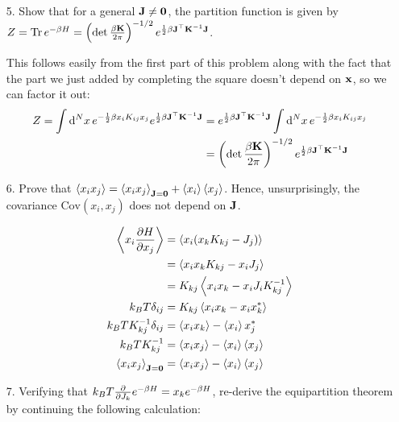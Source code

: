 \documentclass[a4paper,twoside]{article}
\begin{document}
\begin{itemize}
\begin{problem}
\begin{equation}
            \end{equation}
        \end{problem}
    \item[5.] Show that for a general $ \vb{J} \neq \vb{0} $, the partition function is given by $ Z = \Tr e^{- \beta H} = \left( \det \frac{\beta \vb{K}}{2 \pi} \right)^{- 1/2}e^{\frac{1}{2} \beta \vb{J}^\top \vb{K}^{-1} \vb{J}} $.
        \begin{problem}
            This follows easily from the first part of this problem along with the fact that the part we just added by completing the square doesn't depend on $ \vb{x} $, so we can factor it out:
            \begin{align}
                Z = \int \dd[N]{x} e^{- \frac{1}{2} \beta x_i K_{ij} x_j} e^{ \frac{1}{2} \beta \vb{J}^\top \vb{K}^{-1} \vb{J}} &= e^{\frac{1}{2} \beta \vb{J}^\top \vb{K}^{-1} \vb{J}} \int \dd[N]{x} e^{- \frac{1}{2} \beta x_i K_{ij} x_j}\\
                &= \left( \det \frac{\beta \vb{K}}{2 \pi} \right)^{- 1/2}e^{\frac{1}{2} \beta \vb{J}^\top \vb{K}^{-1} \vb{J}}
            \end{align}
        \end{problem}
    \item[6.] Prove that $ \ev{x_i x_j} = \ev{x_i x_j}_{\vb{J} = \vb{0}} + \ev{x_i} \ev{x_j} $. Hence, unsurprisingly, the covariance $ \text{Cov}(x_i, x_j) $ does not depend on $ \vb{J} $.
        \begin{problem}
            \begin{align}
                \ev{x_i \pdv{H}{x_j}} &= \ev{x_i (x_k K_{kj} - J_j)} \\
                &= \ev{x_i x_k K_{kj} - x_i J_j} \\
                &= K_{kj} \ev{x_i x_k - x_i J_i K_{kj}^{-1}} \\
                k_{B} T \delta_{ij} &= K_{kj} \ev{x_i x_k - x_i x_k^*} \\
                k_B T K_{kj}^{-1} \delta_{ij} &= \ev{x_i x_k} - \ev{x_i} x^*_j \\
                k_B T K^{-1}_{kj} &= \ev{x_i x_j} - \ev{x_i} \ev{x_j} \\
                \ev{x_i x_j}_{\vb{J} = \vb{0}} &= \ev{x_i x_j} - \ev{x_i} \ev{x_j}
            \end{align}
        \end{problem}
    \item[7.] Verifying that $ k_B T \pdv{J_k} e^{- \beta H} = x_k e^{- \beta H} $, re-derive the equipartition theorem by continuing the following calculation:

\end{itemize}
\end{document}
